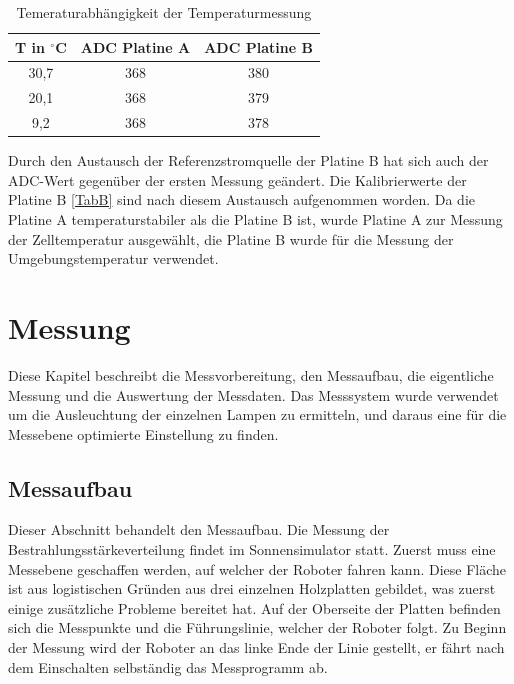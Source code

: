 \documentclass[a4paper,bibtotoc,oneside]{scrbook}
\begin{document}
\begin{table}[htbp]
\centering
\begin{tabular}{ | c | c | c |}\hline
{\bf T in $^{\circ}$C} & {\bf ADC Platine A} & {\bf ADC Platine B}\\ \hline
\hline
30,7 & 368 & 380\\ \hline
20,1 & 368 & 379\\ \hline
9,2 & 368 & 378\\ \hline
\end{tabular}
\caption{Temeraturabhängigkeit der Temperaturmessung}\label{TabT2}
\end{table}

Durch den Austausch der Referenzstromquelle der Platine B hat sich auch der ADC-Wert gegenüber der ersten Messung geändert. Die Kalibrierwerte der Platine B \ref{TabB} sind nach diesem Austausch aufgenommen worden.
Da die Platine A temperaturstabiler als die Platine B ist, wurde Platine A zur Messung der Zelltemperatur ausgewählt, die Platine B wurde für die Messung der Umgebungstemperatur verwendet. 

\chapter{Messung}\thispagestyle{empty}

Diese Kapitel beschreibt die Messvorbereitung, den Messaufbau, die eigentliche Messung und die Auswertung der Messdaten. Das Messsystem wurde verwendet um die Ausleuchtung der einzelnen Lampen zu ermitteln, und daraus eine für die Messebene optimierte Einstellung zu finden.

\section{Messaufbau}\thispagestyle{empty}
Dieser Abschnitt behandelt den Messaufbau. Die Messung der Bestrahlungsstärkeverteilung findet im Sonnensimulator statt. Zuerst muss eine Messebene geschaffen werden, auf welcher der Roboter fahren kann. Diese Fläche ist aus logistischen Gründen aus drei einzelnen Holzplatten gebildet, was zuerst einige zusätzliche Probleme bereitet hat. Auf der Oberseite der Platten befinden sich die Messpunkte und die Führungslinie, welcher der Roboter folgt. Zu Beginn der Messung wird der Roboter an das linke Ende der Linie gestellt, er fährt nach dem Einschalten selbständig das Messprogramm ab.
\end{document}
